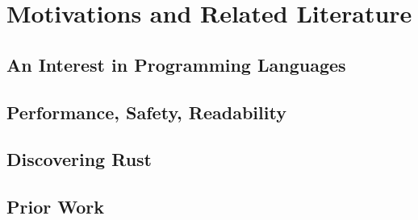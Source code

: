 \section{Motivations and Related Literature}
\label{sec:motivations}

\subsection{An Interest in Programming Languages}

\subsection{Performance, Safety, Readability}

\subsection{Discovering Rust}

\subsection{Prior Work}
